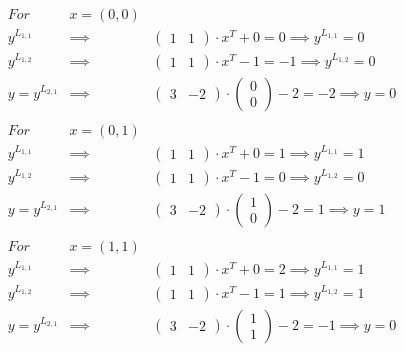 \begin{eqnarray}
    For &\boxed{x = (0, 0)} \nonumber\\
    y^{L_{1,1}} & \implies & \begin{pmatrix}1&1\end{pmatrix} \cdot x^T + 0 = 0 \implies y^{L_{1,1}} = 0 \nonumber\\
    y^{L_{1,2}} & \implies &\begin{pmatrix}1&1\end{pmatrix} \cdot x^T - 1 = -1 \implies y^{L_{1,2}} = 0 \nonumber \\
    y = y^{L_{2,1}} & \implies &\begin{pmatrix}3&-2\end{pmatrix} \cdot \begin{pmatrix}0\\0\end{pmatrix} - 2= -2 \implies \boxed{y = 0} \nonumber \\ \nonumber \\
    For &\boxed{x = (0, 1)} \nonumber\\
    y^{L_{1,1}} & \implies &\begin{pmatrix}1&1\end{pmatrix} \cdot x^T + 0 = 1 \implies y^{L_{1,1}} = 1\nonumber\\
    y^{L_{1,2}} & \implies &\begin{pmatrix}1&1 \end{pmatrix} \cdot x^T - 1 = 0 \implies y^{L_{1,2}} = 0\nonumber\\
    y = y^{L_{2,1}} & \implies &\begin{pmatrix}3&-2\end{pmatrix} \cdot \begin{pmatrix}1\\0\end{pmatrix} - 2 = 1 \implies \boxed{y = 1}\nonumber \\ \nonumber \\
    For &\boxed{x = (1, 1)} \nonumber\\
    y^{L_{1,1}} & \implies &\begin{pmatrix}1&1\end{pmatrix} \cdot x^T + 0 = 2 \implies y^{L_{1,1}} = 1\nonumber\\
    y^{L_{1,2}} & \implies &\begin{pmatrix}1&1 \end{pmatrix} \cdot x^T - 1 = 1 \implies y^{L_{1,2}} = 1\nonumber\\
    y = y^{L_{2,1}} & \implies &\begin{pmatrix}3&-2\end{pmatrix} \cdot \begin{pmatrix}1\\1\end{pmatrix} - 2 = -1 \implies \boxed{y = 0}\nonumber \\ \nonumber
\end{eqnarray}
